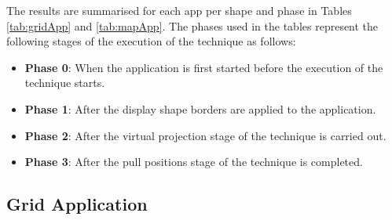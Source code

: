 \documentclass[twocolumn,compsoc]{cvm}
\begin{document}
{The results are summarised for each app per shape and phase in Tables \ref{tab:gridApp} and \ref{tab:mapApp}.
The phases used in the tables represent the following stages of the execution of the technique as follows:
\begin{itemize}
  \item \textbf{Phase 0}: 
  When the application is first started before the execution of the technique starts.
  \item \textbf{Phase 1}: 
  After the display shape borders are applied to the application.
  \item \textbf{Phase 2}: 
  After the virtual projection stage of the technique is carried out.
  \item \textbf{Phase 3}: 
  After the pull positions stage of the technique is completed.
\end{itemize}

\subsection{Grid Application}
\label{subsec:gridresults} 

}
\end{document}
